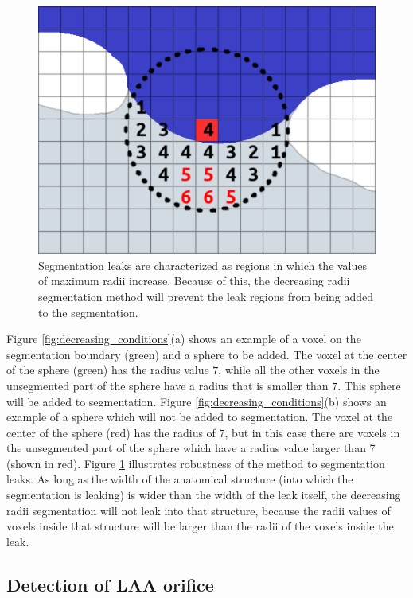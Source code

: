 \documentclass[review]{elsarticle}
\begin{document}
\begin{figure}[t]
  \centering
  \includegraphics[width=0.5\linewidth]{fig7.png}
  \caption{Segmentation leaks are characterized as regions in which the values of 
  maximum radii increase. Because of this, the decreasing radii segmentation 
  method will prevent the leak regions from being added to the segmentation.}
  \label{fig:decreasing_leaks}       %
\end{figure}


Figure \ref{fig:decreasing_conditions}(a) shows an example of a voxel on the
segmentation boundary (green) and a sphere to be added. The voxel at the center
of the sphere (green) has the radius value $7$, while all the other voxels in
the unsegmented part of the sphere have a radius that is smaller than $7$. This
sphere will be added to segmentation.  Figure
\ref{fig:decreasing_conditions}(b) shows an example of a sphere which will not
be added to segmentation. The voxel at the center of the sphere (red) has the
radius of $7$, but in this case there are voxels in the unsegmented part of the
sphere which have a radius value larger than 7 (shown in red). 
Figure \ref{fig:decreasing_leaks} illustrates robustness of the method to
segmentation leaks. As long as the width of the anatomical structure (into
which the segmentation is leaking) is wider than the width of the leak itself,
the decreasing radii segmentation will not leak into that structure, because
the radii values of voxels inside that structure will be larger than the radii
of the voxels inside the leak. 




\subsection{Detection of LAA orifice }
\label{sec:orifice}
\end{document}
